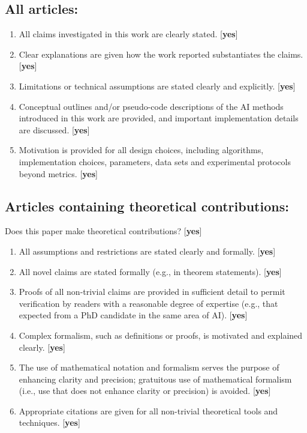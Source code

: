 \subsection*{All articles:}
\begin{enumerate}
  \item All claims investigated in this work are clearly stated. [\textbf{yes}]
  \item Clear explanations are given how the work reported substantiates the claims. [\textbf{yes}]
  \item Limitations or technical assumptions are stated clearly and explicitly. [\textbf{yes}]
  \item Conceptual outlines and/or pseudo-code descriptions of the AI methods introduced in this work are provided, and important implementation details are discussed. [\textbf{yes}]
  \item Motivation is provided for all design choices, including algorithms, implementation choices, parameters, data sets and experimental protocols beyond metrics. [\textbf{yes}]
\end{enumerate}

\subsection*{Articles containing theoretical contributions:}
Does this paper make theoretical contributions? [\textbf{yes}]

\begin{enumerate}
  \item All assumptions and restrictions are stated clearly and formally. [\textbf{yes}]
  \item All novel claims are stated formally (e.g., in theorem statements). [\textbf{yes}]
  \item Proofs of all non-trivial claims are provided in sufficient detail to permit verification by readers with a reasonable degree of expertise (e.g., that expected from a PhD candidate in the same area of AI). [\textbf{yes}]
  \item Complex formalism, such as definitions or proofs, is motivated and explained clearly. [\textbf{yes}]
  \item The use of mathematical notation and formalism serves the purpose of enhancing clarity and precision; gratuitous use of mathematical formalism (i.e., use that does not enhance clarity or precision) is avoided. [\textbf{yes}]
  \item Appropriate citations are given for all non-trivial theoretical tools and techniques. [\textbf{yes}]
\end{enumerate}


